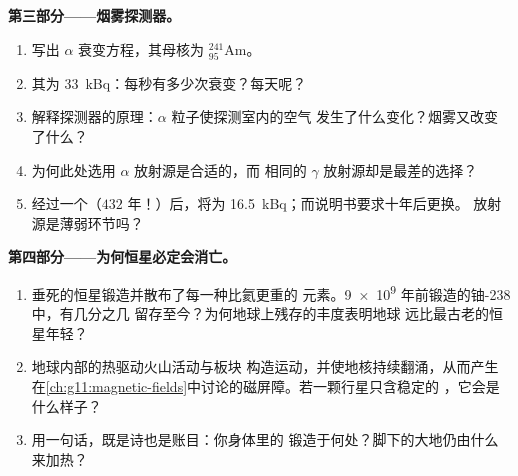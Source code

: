 \begin{problem}
\medskip
\noindent\textbf{第三部分——烟雾探测器。}
\begin{enumerate}[resume]
  \item 写出 $\alpha$ 衰变方程，其母核为 ${}^{241}_{95}\mathrm{Am}$。
  \item 其为 \qty{33}{kBq}：每秒有多少次衰变？每天呢？
  \item 解释探测器的原理：$\alpha$ 粒子使探测室内的空气
        发生了什么变化？烟雾又改变了什么？
  \item 为何此处选用 $\alpha$ 放射源是合适的，而
        相同的 $\gamma$ 放射源却是最差的选择？
  \item 经过一个（$432$ 年！）后，将为
        \qty{16.5}{kBq}；而说明书要求十年后更换。
        放射源是薄弱环节吗？
\end{enumerate}

\medskip
\noindent\textbf{第四部分——为何恒星必定会消亡。}
\begin{enumerate}[resume]
  \item 垂死的恒星锻造并散布了每一种比氦更重的
        元素。\num{9e9} 年前锻造的铀-238 中，有几分之几
        留存至今？为何地球上残存的丰度表明地球
        远比最古老的恒星年轻？
  \item 地球内部的热驱动火山活动与板块
        构造运动，并使地核持续翻涌，从而产生
        在\cref{ch:g11:magnetic-fields}中讨论的磁屏障。若一颗行星只含稳定的
        ，它会是什么样子？
  \item 用一句话，既是诗也是账目：你身体里的
        锻造于何处？脚下的大地仍由什么来加热？
\end{enumerate}
\end{problem}
